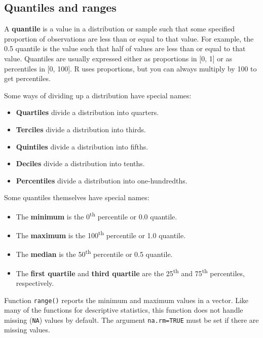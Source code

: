 \documentclass[
  13,
  letterpaper,
]{report}
\begin{document}
\subsection{Quantiles and ranges}\label{sec-06-var-qu}

A \textbf{quantile} is a value in a distribution or sample such that
some specified proportion of observations are less than or equal to that
value. For example, the 0.5 quantile is the value such that half of
values are less than or equal to that value. Quantiles are usually
expressed either as proportions in {[}0, 1{]} or as percentiles in {[}0,
100{]}. R uses proportions, but you can always multiply by 100 to get
percentiles.

Some ways of dividing up a distribution have special names:

\begin{itemize}
\item
  \textbf{Quartiles} divide a distribution into quarters.
\item
  \textbf{Terciles} divide a distribution into thirds.
\item
  \textbf{Quintiles} divide a distribution into fifths.
\item
  \textbf{Deciles} divide a distribution into tenths.
\item
  \textbf{Percentiles} divide a distribution into one-hundredths.
\end{itemize}

Some quantiles themselves have special names:

\begin{itemize}
\item
  The \textbf{minimum} is the 0\textsuperscript{th} percentile or 0.0
  quantile.
\item
  The \textbf{maximum} is the 100\textsuperscript{th} percentile or 1.0
  quantile.
\item
  The \textbf{median} is the 50\textsuperscript{th} percentile or 0.5
  quantile.
\item
  The \textbf{first quartile} and \textbf{third quartile} are the
  25\textsuperscript{th} and 75\textsuperscript{th} percentiles,
  respectively.
\end{itemize}

Function \texttt{range()} reports the minimum and maximum values in a
vector. Like many of the functions for descriptive statistics, this
function does not handle missing (\texttt{NA}) values by default. The
argument \texttt{na.rm=TRUE} must be set if there are missing values.
\end{document}
